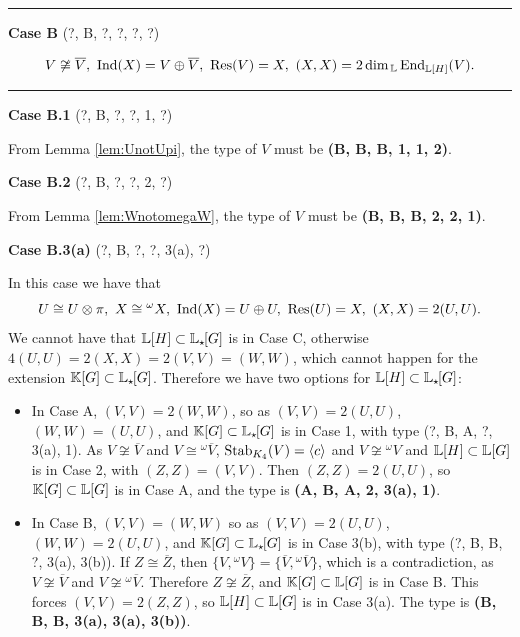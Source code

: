 \vspace{0.5em}
\textcolor{gray}{\hrule}

\vspace{0.9em}
\begin{center}
    \large{\textbf{Case B} (?, B, ?, ?, ?, ?)}
\end{center}
\[
 V \not\cong \overline{V}, \ \Ind(X) = V \oplus \overline{V}, \ \Res(V) = X, \ (X,X) = 2\dim_{\bbL} \End_{\bL[H]}(V).
\]
\vspace{-0.3em}
\textcolor{gray}{\hrule}
\vspace{0.5em}

\vspace{0.5em}
\noindent \textbf{Case B.1} (?, B, ?, ?, 1, ?)

From Lemma \ref{lem:UnotUpi}, the type of $V$ must be \textbf{(B, B, B, 1, 1, 2)}.

\vspace{0.5em}
\noindent \textbf{Case B.2} (?, B, ?, ?, 2, ?)

From Lemma \ref{lem:WnotomegaW}, the type of $V$ must be \textbf{(B, B, B, 2, 2, 1)}.

\vspace{0.5em}
\noindent \textbf{Case B.3(a)} (?, B, ?, ?, 3(a), ?)

In this case we have that 
\[
U \cong U \otimes \pi, \ X \cong {}^{\omega} X, \ \Ind(X) = U \oplus U, \ \Res(U) = X, \ (X,X) = 2(U,U).
\]
We cannot have that ${\mathbb L}[H] \subset {\mathbb L}_{\star \hspace{-0.1em}}[G]$ is in Case C, otherwise $4(U,U) = 2(X,X) = 2(V,V) = (W,W)$, which cannot happen for the extension ${\mathbb K}[G] \subset {\mathbb L}_{\star \hspace{-0.1em}}[G]$. Therefore we have two options for ${\mathbb L}[H] \subset {\mathbb L}_{\star \hspace{-0.1em}}[G]$:
\begin{itemize}
    \item In Case A, $(V,V) = 2(W,W)$, so as $(V,V) = 2(U,U)$, $(W,W) = (U,U)$, and ${\mathbb K}[G] \subset {\mathbb L}_{\star \hspace{-0.1em}}[G]$ is in Case 1, with type (?, B, A, ?, 3(a), 1). As $V \not\cong \overline{V}$ and $V \cong {}^{\omega} \overline{V}$, $\operatorname{Stab}_{K_4}(V) = \langle c \rangle$ and $V \not\cong {}^{\omega} V$ and ${\mathbb L}[H] \subset {\mathbb L}[G]$ is in Case 2, with $(Z,Z) = (V,V)$. Then $(Z,Z) = 2(U,U)$, so ${\mathbb K}[G]\subset {\mathbb L}[G]$ is in Case A, and the type is \textbf{(A, B, A, 2, 3(a), 1)}.
    \item In Case B, $(V,V) = (W,W)$ so as $(V,V) = 2(U,U)$, $(W,W) = 2(U,U)$, and ${\mathbb K}[G] \subset {\mathbb L}_{\star \hspace{-0.1em}}[G]$ is in Case 3(b), with type (?, B, B, ?, 3(a), 3(b)). If $Z \cong \overline{Z}$, then $\{V, {}^{\omega} V \} = \{\overline{V}, {}^{\omega}\overline{V}\}$, which is a contradiction, as $V \not\cong \overline{V}$ and $V \not\cong {}^{\omega}\overline{V}$. Therefore $Z \not\cong \overline{Z}$, and ${\mathbb K}[G] \subset {\mathbb L}[G]$ is in Case B. This forces $(V,V) = 2(Z,Z)$, so ${\mathbb L}[H] \subset {\mathbb L}[G]$ is in Case 3(a). The type is \textbf{(B, B, B, 3(a), 3(a), 3(b))}.
\end{itemize}


